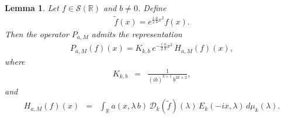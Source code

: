 \documentclass[12pt,a4paper,reqno]{amsproc}
\newtheorem{lemma}[theorem]{Lemma}
\theoremstyle{definition}
\theoremstyle{remark}
\numberwithin{equation}{section}
\begin{document}
\begin{lemma}
Let $f\in\mathcal{S}(\mathbb{R})$ and $b\neq 0$. Define
\begin{eqnarray*}
    \tilde{f}(x) =  e^{\frac{i}{2}\frac{a}{b}x^2}f(x).
\end{eqnarray*}
Then the operator $P_{a,M}$ admits the representation
\begin{eqnarray*}
   P_{a,M}(f)(x) = K_{k,b}\, e^{-\frac{i}{2}\frac{a}{b}x^2}\, H_{a,M}(f)(x),
\end{eqnarray*}
where 
\begin{eqnarray*}
K_{k,b}&=& \frac{1}{(ib)^{k+1}\,b^{2k+2}},
\end{eqnarray*}
and
\begin{eqnarray*}
H_{a,M}(f)(x)&=& \int_{\mathbb{R}}  a(x,\lambda\,b)\, \mathcal{D}_k(\tilde{f})(\lambda)\, E_k(-ix,\lambda)\,d\mu_k(\lambda).  
\end{eqnarray*}
\end{lemma}
\end{document}
